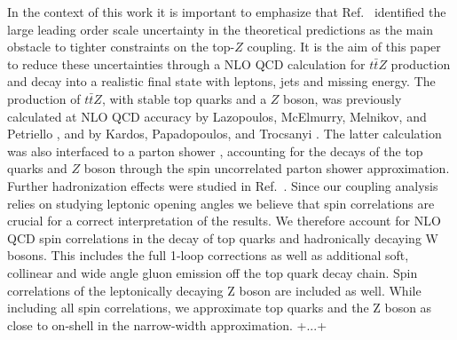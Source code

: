 \documentclass[preprint]{JHEP3} %
\def\Dphill{\Delta \phi_{ll}}
\def\ttbZ{t\bar{t}Z}
\def\ptZ{p_{t,Z}}
\begin{document}
In the context of this work it is important to emphasize that Ref.~\cite{Baur:2004uw} identified the large leading order scale uncertainty in the theoretical predictions 
as the main obstacle to tighter constraints on the top-$Z$ coupling.
It is the aim of this paper to reduce these uncertainties through a NLO QCD calculation for $\ttbZ$ production and decay into a realistic final state with leptons, jets and missing energy.
The production of $\ttbZ$, with stable top quarks and a $Z$ boson, was previously calculated at NLO QCD accuracy by Lazopoulos, McElmurry, Melnikov, and Petriello \cite{Lazopoulos:2008de}, and  by Kardos, Papadopoulos, and Trocsanyi \cite{Kardos:2011na}.
The latter calculation was also interfaced to a parton shower \cite{Garzelli:2011is}, accounting for the decays of the top quarks and $Z$ boson through the spin uncorrelated parton shower approximation.
Further hadronization effects were studied in Ref.~\cite{Garzelli:2012bn}.
Since our coupling analysis relies on studying leptonic opening angles we believe that spin correlations are crucial for a correct interpretation of the results.
We therefore account for NLO QCD spin correlations in the decay of top quarks and hadronically decaying W bosons.
This includes the full 1-loop corrections as well as additional soft, collinear and wide angle gluon emission off the top quark decay chain.
Spin correlations of the leptonically decaying Z boson are included as well.
While including all spin correlations, we approximate top quarks and the Z boson as close to on-shell in the narrow-width approximation. +...+
\end{document}
